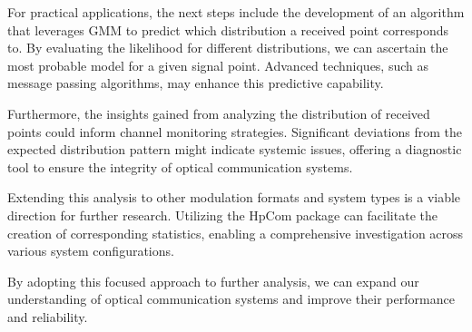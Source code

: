 For practical applications, the next steps include the development of an algorithm that leverages GMM to predict which distribution a received point corresponds to. By evaluating the likelihood for different distributions, we can ascertain the most probable model for a given signal point. Advanced techniques, such as message passing algorithms, may enhance this predictive capability.

Furthermore, the insights gained from analyzing the distribution of received points could inform channel monitoring strategies. Significant deviations from the expected distribution pattern might indicate systemic issues, offering a diagnostic tool to ensure the integrity of optical communication systems.

Extending this analysis to other modulation formats and system types is a viable direction for further research. Utilizing the HpCom package can facilitate the creation of corresponding statistics, enabling a comprehensive investigation across various system configurations.

By adopting this focused approach to further analysis, we can expand our understanding of optical communication systems and improve their performance and reliability.
